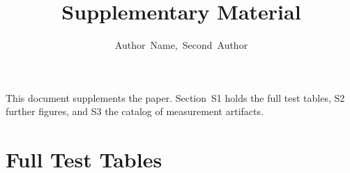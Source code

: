 \documentclass[journal]{IEEEtran}
\begin{document}
\title{Supplementary Material}
\author{Author~Name,~Second~Author}
\maketitle
\noindent This document supplements the paper. Section~S1 holds the full test tables, S2 further figures, and S3 the catalog of measurement artifacts.

\clearpage
\section{Full Test Tables}
\label{sec:s1}

\begin{table}[t]
\centering\footnotesize
\caption{E4, RTX 5070 Ti, our modified module: wall-\allowbreak{}clock of each speculation arm against C0 (the shipped driver) on Stencil-\allowbreak{}24K and GraphBFS-\allowbreak{}23, family F1 (prefetcher on) and the F4 row (perfect staging, prefetcher off). Two-\allowbreak{}sided Mann-\allowbreak{}Whitney U, one Holm family of 18, n =\allowbreak{} 10 per cell. The MDE is at the family alpha, alpha/\allowbreak{}18. Supports Section VI (speculation against the shipped driver, E4).}
\label{tab:s-t_e4}
\end{table}

\begin{table}[t]
\centering\footnotesize
\caption{E5, Stencil-\allowbreak{}24K, RTX 5070 Ti: demand-\allowbreak{}fault reduction D(t) of C7W512 against C0 at the same threshold, and the wall-\allowbreak{}clock change, at thresholds 51, 75 and 100 (100 disables the density rule). Two-\allowbreak{}sided Mann-\allowbreak{}Whitney U, Holm across 3, n =\allowbreak{} 10 per cell; MDE at alpha/\allowbreak{}3. Supports Section VI (the prefetcher's density rule, E5).}
\label{tab:s-t_e5}
\end{table}

\begin{table}[t]
\centering\footnotesize
\caption{E6, Stencil-\allowbreak{}24K, RTX 5070 Ti: C7W512 at the shipped threshold against C0 at thresholds 0, 10, 25 and 51 (Holm family of 4), and C7W512 against C0 at the same threshold on wall-\allowbreak{}clock and on demand faults (two Holm families of 3). n =\allowbreak{} 10 per cell. MDEs are computed at each family's own corrected level. Supports Section VI (matched-\allowbreak{}threshold comparisons, E6).}
\label{tab:s-t_e6}
\end{table}
\end{document}
